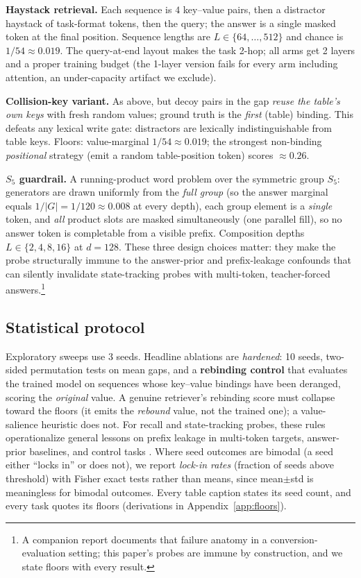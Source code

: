 \documentclass{article}
\begin{document}
\textbf{Haystack retrieval.} Each sequence is $4$ key--value pairs, then a distractor haystack of task-format tokens, then the query; the answer is a single masked token at the final position. Sequence lengths are $L\in\{64,\dots,512\}$ and chance is $1/54\approx 0.019$. The query-at-end layout makes the task 2-hop; all arms get 2 layers and a proper training budget (the 1-layer version fails for every arm including attention, an under-capacity artifact we exclude).

\textbf{Collision-key variant.} As above, but decoy pairs in the gap \emph{reuse the table's own keys} with fresh random values; ground truth is the \emph{first} (table) binding. This defeats any lexical write gate: distractors are lexically indistinguishable from table keys. Floors: value-marginal $1/54\approx 0.019$; the strongest non-binding \emph{positional} strategy (emit a random table-position token) scores ${\approx}0.26$.

\textbf{$S_5$ guardrail.} A running-product word problem over the symmetric group $S_5$: generators are drawn uniformly from the \emph{full group} (so the answer marginal equals $1/|G| = 1/120 \approx 0.008$ at every depth), each group element is a \emph{single} token, and \emph{all} product slots are masked simultaneously (one parallel fill), so no answer token is completable from a visible prefix. Composition depths $L\in\{2,4,8,16\}$ at $d{=}128$. These three design choices matter: they make the probe structurally immune to the answer-prior and prefix-leakage confounds that can silently invalidate state-tracking probes with multi-token, teacher-forced answers.\footnote{A companion report documents that failure anatomy in a conversion-evaluation setting; this paper's probes are immune by construction, and we state floors with every result.}

\subsection{Statistical protocol}\label{sec:stats}

Exploratory sweeps use 3 seeds. Headline ablations are \emph{hardened}: 10 seeds, two-sided permutation tests on mean gaps, and a \textbf{rebinding control} that evaluates the trained model on sequences whose key--value bindings have been deranged, scoring the \emph{original} value. A genuine retriever's rebinding score must collapse toward the floors (it emits the \emph{rebound} value, not the trained one); a value-salience heuristic does not. For recall and state-tracking probes, these rules operationalize general lessons on prefix leakage in multi-token targets, answer-prior baselines, and control tasks \citep{bachmann2024pitfalls,holtzman2021surface,hewitt2019control}. Where seed outcomes are bimodal (a seed either ``locks in'' or does not), we report \emph{lock-in rates} (fraction of seeds above threshold) with Fisher exact tests rather than means, since mean$\pm$std is meaningless for bimodal outcomes. Every table caption states its seed count, and every task quotes its floors (derivations in Appendix~\ref{app:floors}).
\end{document}
